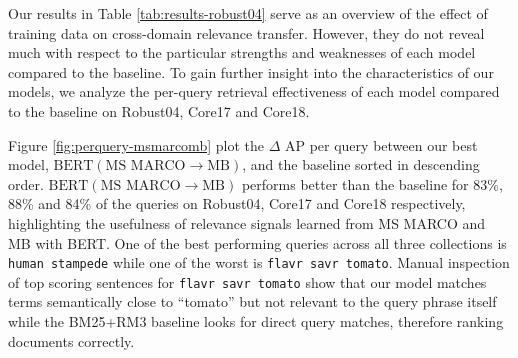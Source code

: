 Our results in Table \ref{tab:results-robust04} serve as an overview of the effect of training data on cross-domain relevance transfer.
However, they do not reveal much with respect to the particular strengths and weaknesses of each model compared to the baseline.
To gain further insight into the characteristics of our models, we analyze the per-query retrieval effectiveness of each model compared to the baseline on Robust04, Core17 and Core18.

Figure \ref{fig:perquery-msmarcomb} plot the $\Delta$ AP per query between our best model, $ \textrm{BERT}(\textrm{MS MARCO}\rightarrow\textrm{MB}) $, and the baseline sorted in descending order.
$ \textrm{BERT}(\textrm{MS MARCO}\rightarrow\textrm{MB}) $ performs better than the baseline for 83\%, 88\% and 84\% of the queries on Robust04, Core17 and Core18 respectively, highlighting the usefulness of relevance signals learned from MS MARCO and MB with BERT.
One of the best performing queries across all three collections is \texttt{human stampede} while one of the worst is \texttt{flavr savr tomato}.
Manual inspection of top scoring sentences for \texttt{flavr savr tomato} show that our model matches terms semantically close to ``tomato'' but not relevant to the query phrase itself while the BM25+RM3 baseline looks for direct query matches, therefore ranking documents correctly.



